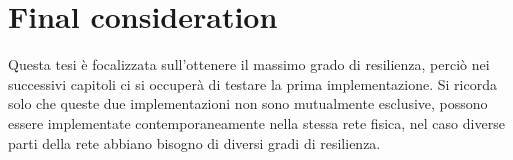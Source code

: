 \section{Final consideration}
Questa tesi è focalizzata sull'ottenere il massimo grado di resilienza, perciò nei successivi capitoli ci si occuperà di testare la prima implementazione. Si ricorda solo che queste due implementazioni non sono mutualmente esclusive, possono essere implementate contemporaneamente nella stessa rete fisica, nel caso diverse parti della rete abbiano bisogno di diversi gradi di resilienza.